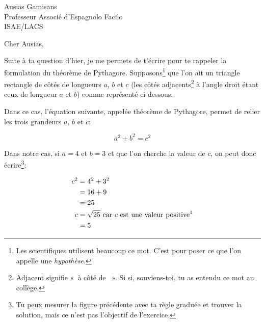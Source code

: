 \documentclass[pdftex,a4paper,12pt,origdate]{supaero-lettre}
\begin{document}


\begin{letter}{Ausias Gamisans\\ Professeur Associé d'Espagnolo
    Facilo\\ISAE/LACS}

\opening{Cher Ausias,}

Suite à ta question d'hier, je me permets de t'écrire pour te rappeler
la formulation du théorème de Pythagore. Supposons\footnote{Les
  scientifiques utilisent beaucoup ce mot. C'est pour poser ce que
  l'on appelle une \emph{hypothèse}.} que l'on ait un triangle
rectangle de côtés de longueurs $a$, $b$ et $c$ (les côtés
adjacents\footnote{Adjacent signifie «~à côté de ~». Si si,
  souviens-toi, tu as entendu ce mot au collège.} à l'angle droit
étant ceux de longueur $a$ et $b$) comme représenté ci-dessous:


  Dans ce cas, l'équation suivante, appelée théorème de Pythagore,
  permet de relier les trois grandeurs $a$, $b$ et $c$:

    \begin{equation}
      \label{eq:1}
      a^2 + b^2 = c^2
    \end{equation}

Dans notre cas, si $a = 4$ et $b = 3$ et que l'on cherche la valeur de
$c$, on peut donc écrire\footnote{Tu peux mesurer la figure précédente
  avec ta règle graduée et trouver la solution, mais ce n'est pas
  l'objectif de l'exercice.}:

\begin{equation*}
  \begin{split}
    c^2 & = 4^2 + 3^2\\
     & = 16 + 9\\
     & = 25\\
    c & = \sqrt{25} \text{ car $c$ est une valeur
      positive\footnotemark}\\
      & = 5
  \end{split}
\end{equation*}


\end{letter}
\end{document}
